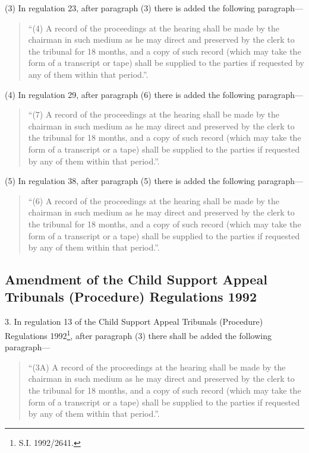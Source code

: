 \documentclass[a4paper]{article}
\begin{document}
(3) In regulation 23, after paragraph (3) there is added the following paragraph—
\begin{quotation}
“(4) A record of the proceedings at the hearing shall be made by the chairman in such medium as he may direct and preserved by the clerk to the tribunal for 18 months, and a copy of such record (which may take the form of a transcript or tape) shall be supplied to the parties if requested by any of them within that period.”.
\end{quotation}

(4) In regulation 29, after paragraph (6) there is added the following paragraph—
\begin{quotation}
“(7) A record of the proceedings at the hearing shall be made by the chairman in such medium as he may direct and preserved by the clerk to the tribunal for 18 months, and a copy of such record (which may take the form of a transcript or a tape) shall be supplied to the parties if requested by any of them within that period.”.
\end{quotation}

(5) In regulation 38, after paragraph (5) there is added the following paragraph—
\begin{quotation}
“(6) A record of the proceedings at the hearing shall be made by the chairman in such medium as he may direct and preserved by the clerk to the tribunal for 18 months, and a copy of such record (which may take the form of a transcript or a tape) shall be supplied to the parties if requested by any of them within that period.”.
\end{quotation}

\subsection[3. Amendment of the Child Support Appeal Tribunals (Procedure) Regulations 1992]{Amendment of the Child Support Appeal Tribunals (Procedure) Regulations 1992}

3.  In regulation 13 of the Child Support Appeal Tribunals (Procedure) Regulations 1992\footnote{\frenchspacing S.I. 1992/2641.}, after paragraph (3) there shall be added the following paragraph—
\begin{quotation}
“(3A) A record of the proceedings at the hearing shall be made by the chairman in such medium as he may direct and preserved by the clerk to the tribunal for 18 months, and a copy of such record (which may take the form of a transcript or a tape) shall be supplied to the parties if requested by any of them within that period.”.
\end{quotation}
\end{document}
